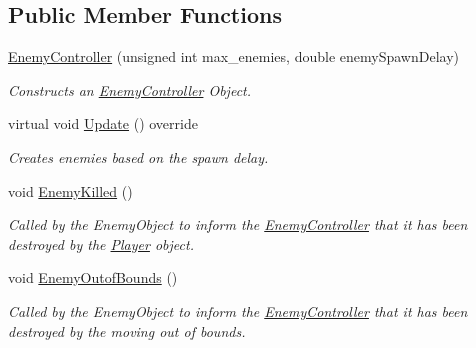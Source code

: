 \subsection*{Public Member Functions}
\begin{DoxyCompactItemize}
\item 
\hyperlink{class_enemy_controller_a3364fe98342c659a62633e9e003ef0f6}{Enemy\+Controller} (unsigned int max\+\_\+enemies, double enemy\+Spawn\+Delay)
\begin{DoxyCompactList}\small\item\em Constructs an \hyperlink{class_enemy_controller}{Enemy\+Controller} Object. \end{DoxyCompactList}\item 
\mbox{\label{class_enemy_controller_af36ec67442d30c7519581b83ad6c00db}} 
virtual void \hyperlink{class_enemy_controller_af36ec67442d30c7519581b83ad6c00db}{Update} () override
\begin{DoxyCompactList}\small\item\em Creates enemies based on the spawn delay. \end{DoxyCompactList}\item 
\mbox{\label{class_enemy_controller_a011030dd51b78317ecb16356bf6591dc}} 
void \hyperlink{class_enemy_controller_a011030dd51b78317ecb16356bf6591dc}{Enemy\+Killed} ()
\begin{DoxyCompactList}\small\item\em Called by the Enemy\+Object to inform the \hyperlink{class_enemy_controller}{Enemy\+Controller} that it has been destroyed by the \hyperlink{class_player}{Player} object. \end{DoxyCompactList}\item 
void \hyperlink{class_enemy_controller_a182dba707716f8079bb6e67e8c5ed4ad}{Enemy\+Outof\+Bounds} ()
\begin{DoxyCompactList}\small\item\em Called by the Enemy\+Object to inform the \hyperlink{class_enemy_controller}{Enemy\+Controller} that it has been destroyed by the moving out of bounds. \end{DoxyCompactList}\end{DoxyCompactItemize}
